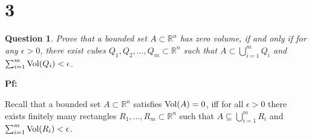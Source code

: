 \documentclass{article}
\newtheorem{question}{Question}
\begin{document}
\break

\section*{3}
\begin{myBox}[]{}
    \begin{question}
        Prove that a bounded set $A\subset\mathbb{R}^n$ has zero volume, if and only if for any $\epsilon>0$, there exist cubes $Q_1,Q_2,...,Q_m\subset\mathbb{R}^n$ such that $A\subset\bigcup_{i=1}^{m}Q_i$ and $\sum_{i=1}^{m}\textmd{Vol}(Q_i)<\epsilon$.
    \end{question}
\end{myBox}

\textbf{Pf:}

Recall that a bounded set $A\subset\mathbb{R}^n$ satisfies $\textmd{Vol}(A)=0$, iff for all $\epsilon>0$ there exists finitely many rectangles $R_1,...,R_m\subset \mathbb{R}^n$ such that $A\subseteq \bigcup_{i=1}^{m}R_i$ and $\sum_{i=1}^{m}\textmd{Vol}(R_i)<\epsilon$. 
\end{document}
